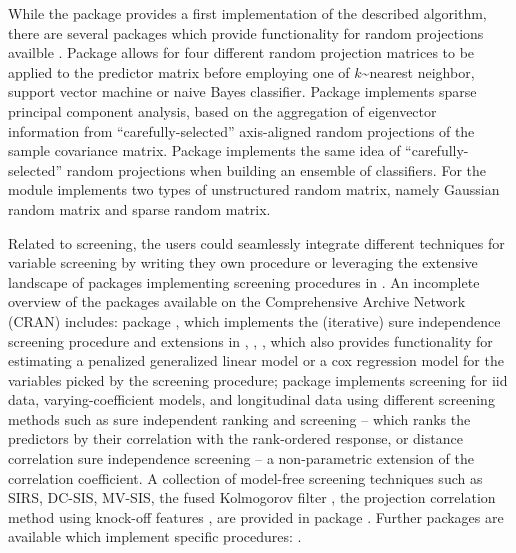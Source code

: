 \documentclass[
  article]{jss}
\begin{document}
While the package provides a first implementation of the described
algorithm, there are several packages which provide functionality for
random projections availble . Package 
\citep{RandProR, SIDDHARTH2020100629} allows for four different random
projection matrices to be applied to the predictor matrix before
employing one of \(k\)\textasciitilde nearest neighbor, support vector
machine or naive Bayes classifier. Package 
\citep{SPCAvRPR} implements sparse principal component analysis, based
on the aggregation of eigenvector information from
``carefully-selected'' axis-aligned random projections of the sample
covariance matrix. Package  \citep{RPEnsembleR}
implements the same idea of ``carefully-selected'' random projections
when building an ensemble of classifiers. For 
\citet{Python} the  module implements
two types of unstructured random matrix, namely Gaussian random matrix
and sparse random matrix.

Related to screening, the users could seamlessly integrate different
techniques for variable screening by writing they own procedure or
leveraging the extensive landscape of packages implementing screening
procedures in . An incomplete overview of the packages
available on the Comprehensive  Archive Network (CRAN)
includes: package  \citep{SISR}, which implements the
(iterative) sure independence screening procedure and extensions in
\citet{Fan2007SISforUHD}, \citet{Fan2010sisglms}, \citet{fan2010high},
which also provides functionality for estimating a penalized generalized
linear model or a cox regression model for the variables picked by the
screening procedure; package 
\citep{pkg:VariableScreening} implements screening for iid data,
varying-coefficient models, and longitudinal data using different
screening methods such as sure independent ranking and screening --
which ranks the predictors by their correlation with the rank-ordered
response, or distance correlation sure independence screening -- a
non-parametric extension of the correlation coefficient. A collection of
model-free screening techniques such as SIRS, DC-SIS, MV-SIS, the fused
Kolmogorov filter \citep{mai2015fusedkolmogorov}, the projection
correlation method using knock-off features \citep{liu2020knockoff}, are
provided in package  \citep{pkg:MFSIS}. Further packages are
available which implement specific procedures:
\citep[\citet{pkg:fusionclust}]{pkg:tilting, pkg:cdcsis, pkg:QCSIS, pkg:LqG}.
\end{document}
